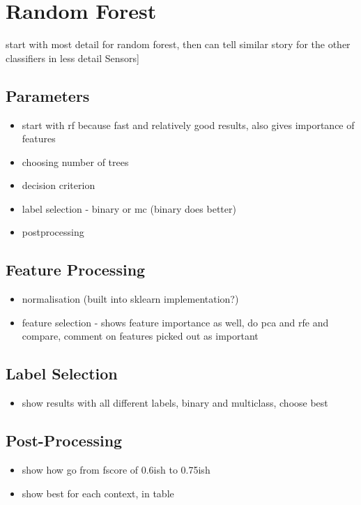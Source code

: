 \section{Random Forest}
\label{sec:exp-rf}
    start with most detail for random forest, then can tell similar story for the other classifiers in less detail
Sensors]
    \subsection{Parameters}
    \label{subsec:exp-rf-param}
        \begin{itemize}
            \item{start with rf because fast and relatively good results, also gives importance of features}
            \item{choosing number of trees}
            \item{decision criterion}
            
            \item{label selection - binary or mc (binary does better)}
            \item{postprocessing}
        \end{itemize}
    
    \subsection{Feature Processing}
    \label{subsec:rf-feats}
        \begin{itemize}
            \item{normalisation (built into sklearn implementation?)}
            \item{feature selection - shows feature importance as well, do pca and rfe and compare, comment on features picked out as important}
        \end{itemize}
    
    \subsection{Label Selection}
    \label{subsec:rf-labels}
        \begin{itemize}
            \item{show results with all different labels, binary and multiclass, choose best}
        \end{itemize}
        
    \subsection{Post-Processing}
    \label{subsec:rf-postproc}
        \begin{itemize}
            \item{show how go from fscore of 0.6ish to 0.75ish}
            \item{show best for each context, in table}
        \end{itemize}